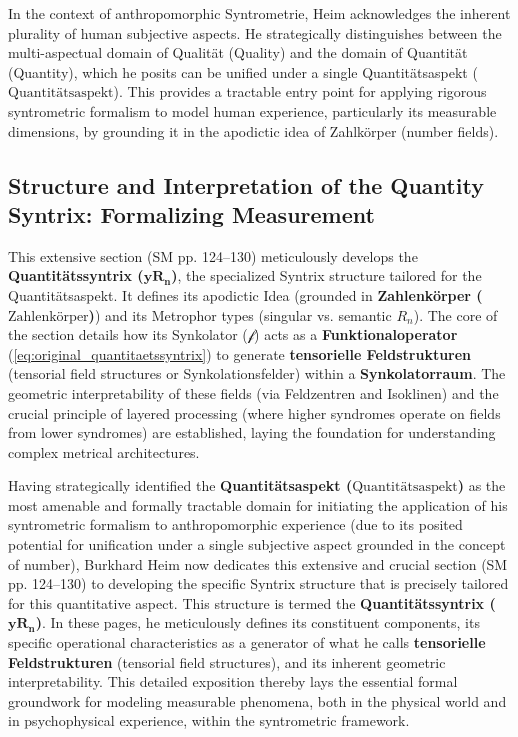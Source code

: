 \documentclass[12pt]{article}
\newcommand{\quantitaetsaspekt}{\text{Quantitätsaspekt}}
\newcommand{\quantitaetssyntrix}{\bm{yR_n}}
\newcommand{\zahlenkoerper}{\text{Zahlenkörper}}
\newcommand{\funktionaloperator}{\mathcal{f}}
\begin{document}
In the context of anthropomorphic Syntrometrie, Heim acknowledges the inherent plurality of human subjective aspects. He strategically distinguishes between the multi-aspectual domain of Qualität (Quality) and the domain of Quantität (Quantity), which he posits can be unified under a single Quantitätsaspekt (\(\quantitaetsaspekt\)). This provides a tractable entry point for applying rigorous syntrometric formalism to model human experience, particularly its measurable dimensions, by grounding it in the apodictic idea of Zahlkörper (number fields).

\subsection{Structure and Interpretation of the Quantity Syntrix: Formalizing Measurement}
\label{sec:quantity_syntrix}

This extensive section (SM pp. 124–130) meticulously develops the \textbf{Quantitätssyntrix (\(\quantitaetssyntrix\))}, the specialized Syntrix structure tailored for the Quantitätsaspekt. It defines its apodictic Idea (grounded in \textbf{Zahlenkörper (\(\zahlenkoerper\))}) and its Metrophor types (singular vs. semantic \(R_n\)). The core of the section details how its Synkolator (\(\funktionaloperator\)) acts as a \textbf{Funktionaloperator} (\eqref{eq:original_quantitaetssyntrix}) to generate \textbf{tensorielle Feldstrukturen} (tensorial field structures or Synkolationsfelder) within a \textbf{Synkolatorraum}. The geometric interpretability of these fields (via Feldzentren and Isoklinen) and the crucial principle of layered processing (where higher syndromes operate on fields from lower syndromes) are established, laying the foundation for understanding complex metrical architectures.

Having strategically identified the \textbf{Quantitätsaspekt (\(\quantitaetsaspekt\))} as the most amenable and formally tractable domain for initiating the application of his syntrometric formalism to anthropomorphic experience (due to its posited potential for unification under a single subjective aspect grounded in the concept of number), Burkhard Heim now dedicates this extensive and crucial section (SM pp. 124–130) to developing the specific Syntrix structure that is precisely tailored for this quantitative aspect. This structure is termed the \textbf{Quantitätssyntrix (\(\quantitaetssyntrix\))}. In these pages, he meticulously defines its constituent components, its specific operational characteristics as a generator of what he calls \textbf{tensorielle Feldstrukturen} (tensorial field structures), and its inherent geometric interpretability. This detailed exposition thereby lays the essential formal groundwork for modeling measurable phenomena, both in the physical world and in psychophysical experience, within the syntrometric framework.
\end{document}
